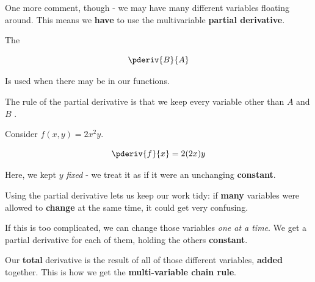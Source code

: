         One more comment, though - we may have many different variables floating around. This means we \textbf{have} to use the multivariable \textbf{partial derivative}.\\
        
        \begin{definition}
            The  
            
            \begin{equation*}
                \pderiv{B}{A}
            \end{equation*}
            
            Is used when there may be  in our functions.
            
            The rule of the partial derivative is that we keep every  variable other than $A$ and $B$ .
        \end{definition}
        
        \miniex Consider $f(x,y) = 2x^2y$.
        
        \begin{equation}
            \pderiv{f}{x} = 2(2x)y
        \end{equation}
        
        Here, we kept $y$ \textit{fixed} - we treat it as if it were an unchanging \textbf{constant}. 
        
        Using the partial derivative lets us keep our work tidy: if \textbf{many} variables were allowed to \textbf{change} at the same time, it could get very confusing. 
        
        If this is too complicated, we can change those variables \textit{one at a time}. We get a partial derivative for each of them, holding the others \textbf{constant}.
        
        Our \textbf{total} derivative is the result of all of those different variables, \textbf{added} together. This is how we get the \textbf{multi-variable chain rule}.\\ 
        
